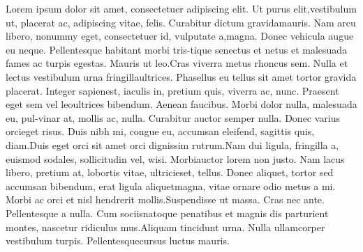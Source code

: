 \documentclass[11pt,a4paper]{article}
\begin{document}
Lorem ipsum dolor sit amet, consectetuer adipiscing elit. Ut purus elit,vestibulum ut, placerat ac, adipiscing vitae, felis. Curabitur dictum gravidamauris.  Nam arcu libero, nonummy eget, consectetuer id, vulputate a,magna. Donec vehicula augue eu neque. Pellentesque habitant morbi tris-tique senectus et netus et malesuada fames ac turpis egestas. Mauris ut leo.Cras viverra metus rhoncus sem. Nulla et lectus vestibulum urna fringillaultrices. Phasellus eu tellus sit amet tortor gravida placerat. Integer sapienest, iaculis in, pretium quis, viverra ac, nunc.  Praesent eget sem vel leoultrices bibendum. Aenean faucibus. Morbi dolor nulla, malesuada eu, pul-vinar at, mollis ac, nulla. Curabitur auctor semper nulla. Donec varius orcieget risus. Duis nibh mi, congue eu, accumsan eleifend, sagittis quis, diam.Duis eget orci sit amet orci dignissim rutrum.Nam dui ligula, fringilla a, euismod sodales, sollicitudin vel, wisi. Morbiauctor lorem non justo. Nam lacus libero, pretium at, lobortis vitae, ultricieset, tellus. Donec aliquet, tortor sed accumsan bibendum, erat ligula aliquetmagna, vitae ornare odio metus a mi. Morbi ac orci et nisl hendrerit mollis.Suspendisse ut massa.  Cras nec ante.  Pellentesque a nulla.  Cum sociisnatoque penatibus et magnis dis parturient montes, nascetur ridiculus mus.Aliquam tincidunt urna. Nulla ullamcorper vestibulum turpis. Pellentesquecursus luctus mauris.
\end{document}
